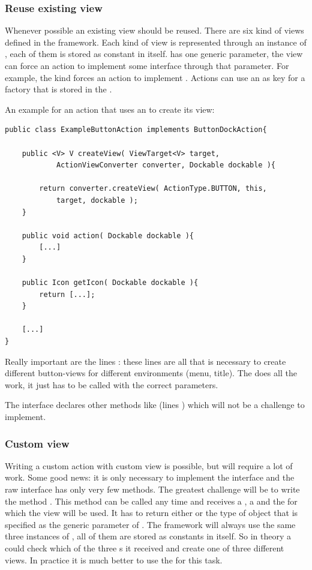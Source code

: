 \subsubsection{Reuse existing view}
Whenever possible an existing view should be reused. There are six kind of views defined in the framework. Each kind of view is represented through an instance of , each of them is stored as constant in  itself.  has one generic parameter, the view can force an action to implement some interface through that parameter. For example, the kind  forces an action to implement . Actions can use an  as key for a factory that is stored in the . 

An example for an action that uses an  to create its view:
\begin{lstlisting}
public class ExampleButtonAction implements ButtonDockAction{

	public <V> V createView( ViewTarget<V> target,
			ActionViewConverter converter, Dockable dockable ){
	
		return converter.createView( ActionType.BUTTON, this, 
			target, dockable );
	}
	
	public void action( Dockable dockable ){
		[...]
	}
	
	public Icon getIcon( Dockable dockable ){
		return [...];
	}
	
	[...]
}
\end{lstlisting}
Really important are the lines : these lines are all that is necessary to create different button-views for different environments (menu, title). The  does all the work, it just has to be called with the correct parameters.

The interface  declares other methods like  (lines ) which will not be a challenge to implement.

\subsubsection{Custom view}
Writing a custom action with custom view is possible, but will require a lot of work. Some good news: it is only necessary to implement the interface  and the raw interface  has only very few methods. The greatest challenge will be to write the method . This method can be called any time and receives a , a  and the  for which the view will be used. It has to return either  or the type of object that is specified as the generic parameter of . The framework will always use the same three instances of , all of them are stored as constants in  itself. So in theory a  could check which of the three s it received and create one of three different views. In practice it is much better to use the  for this task.

